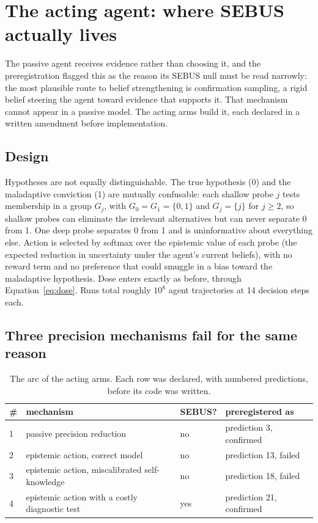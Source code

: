 \documentclass[11pt]{article}
\begin{document}
\section{The acting agent: where SEBUS actually lives}
\label{sec:acting}

The passive agent receives evidence rather than choosing it, and the preregistration
flagged this as the reason its SEBUS null must be read narrowly: the most plausible
route to belief strengthening is confirmation sampling, a rigid belief steering the
agent toward evidence that supports it. That mechanism cannot appear in a passive
model. The acting arms build it, each declared in a written amendment before
implementation.

\subsection{Design}

Hypotheses are not equally distinguishable. The true hypothesis (0) and the
maladaptive conviction (1) are mutually confusable: each shallow probe $j$ tests
membership in a group $G_j$, with $G_0 = G_1 = \{0, 1\}$ and $G_j = \{j\}$ for $j \ge
2$, so shallow probes can eliminate the irrelevant alternatives but can never
separate 0 from 1. One deep probe separates 0 from 1 and is uninformative about
everything else. Action is selected by softmax over the epistemic value of each probe
(the expected reduction in uncertainty under the agent's current beliefs), with no
reward term and no preference that could smuggle in a bias toward the maladaptive
hypothesis. Dose enters exactly as before, through Equation~\ref{eq:dose}. Runs
total roughly $10^8$ agent trajectories at 14 decision steps each.

\subsection{Three precision mechanisms fail for the same reason}

\begin{table}[t]
\centering
\caption{The arc of the acting arms. Each row was declared, with numbered
predictions, before its code was written.}
\label{tab:arc}
\begin{tabular}{llll}
\toprule
\# & mechanism & SEBUS? & preregistered as \\
\midrule
1 & passive precision reduction & no & prediction 3, confirmed \\
2 & epistemic action, correct model & no & prediction 13, failed \\
3 & epistemic action, miscalibrated self-knowledge & no & prediction 18, failed \\
4 & epistemic action with a costly diagnostic test & yes & prediction 21, confirmed \\
\bottomrule
\end{tabular}
\end{table}
\end{document}
